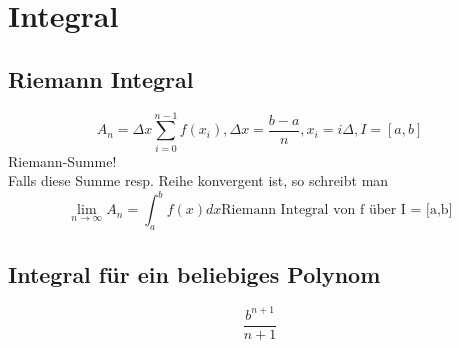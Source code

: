 \section{Integral}
\subsection{Riemann Integral}
\[ \boxed{A_n = \Delta x \sum_{i=0}^{n-1} f(x_i) 
, \Delta x = \frac{b - a}{n} , x_i = i \Delta , I = [a,b]} \]
Riemann-Summe! \\
Falls diese Summe resp. Reihe konvergent ist, so schreibt man
\[ \boxed{\lim_{n \rightarrow \infty} A_n = \int_{a}^{b} f(x) d x \text{Riemann Integral von f über I = [a,b]} } \]

\subsection{Integral für ein beliebiges Polynom}
\[ \boxed{\frac{b^{n + 1}}{n + 1}} \]